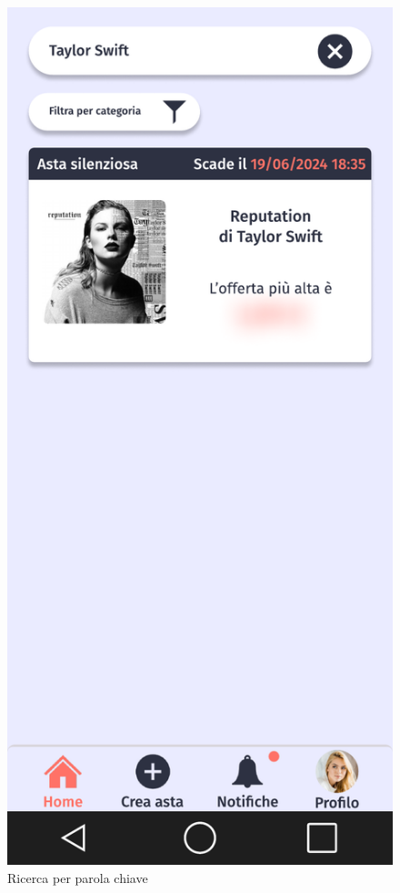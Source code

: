     \begin{figure}[!htb]
        \begin{minipage}{0.32\textwidth}
            \centering
            \includegraphics[width=.7\linewidth]{Immagini/Frames/Compratore/C2.pdf}
            \caption{Ricerca per parola chiave}
        \end{minipage}\hfill
        \begin{minipage}{0.32\textwidth}
            \centering

\end{minipage}
\end{figure}

